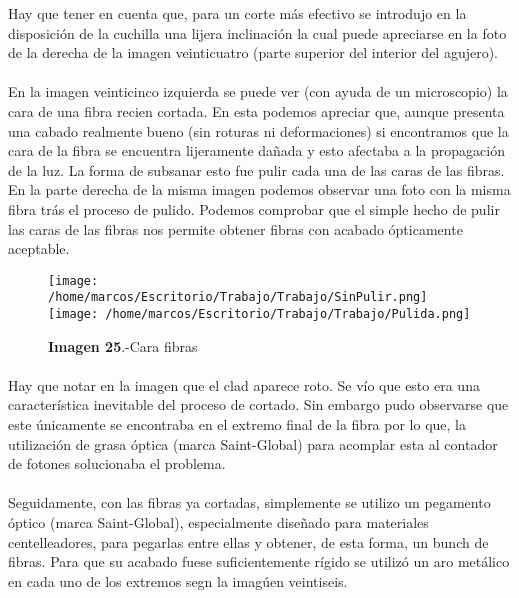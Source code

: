 \newpage
Hay que tener en cuenta que, para un corte más efectivo se introdujo en la disposición de la cuchilla una lijera inclinación la cual puede apreciarse en la foto de la derecha de la imagen veinticuatro (parte superior del interior del agujero). 

\paragraph {}
En la imagen veinticinco izquierda se puede ver (con ayuda de un microscopio) la cara de una fibra recien cortada. En esta podemos apreciar que, aunque presenta una cabado realmente bueno (sin roturas ni deformaciones) si encontramos que la cara de la fibra se encuentra lijeramente dañada y esto afectaba a la propagación de la luz. La forma de subsanar esto fue pulir cada una de las caras de las fibras. En la parte derecha de la misma imagen podemos observar una foto con la misma fibra trás el proceso de pulido. Podemos comprobar que el simple hecho de pulir las caras de las fibras nos permite obtener fibras con acabado ópticamente aceptable.

\begin{figure}[htb]
\centering
{
\texttt{[image: /home/marcos/Escritorio/Trabajo/Trabajo/SinPulir.png]} 
}
{
\texttt{[image: /home/marcos/Escritorio/Trabajo/Trabajo/Pulida.png]} 
}
\caption{\textbf{Imagen 25}.-Cara fibras}
\end{figure} 

\paragraph {}
Hay que notar en la imagen que el clad aparece roto. Se vío que esto era una característica inevitable del proceso de cortado. Sin embargo pudo observarse que este únicamente se encontraba en el extremo final de la fibra por lo que, la utilización de grasa óptica (marca Saint-Global) para acomplar esta al contador de fotones solucionaba el problema.

\paragraph {}
Seguidamente, con las fibras ya cortadas, simplemente se utilizo un pegamento óptico (marca Saint-Global), especialmente diseñado para materiales centelleadores, para pegarlas entre ellas y obtener, de esta forma, un bunch de fibras. Para que su acabado fuese suficientemente rígido se utilizó un aro metálico en cada uno de los extremos segn la imagúen veintiseis.

